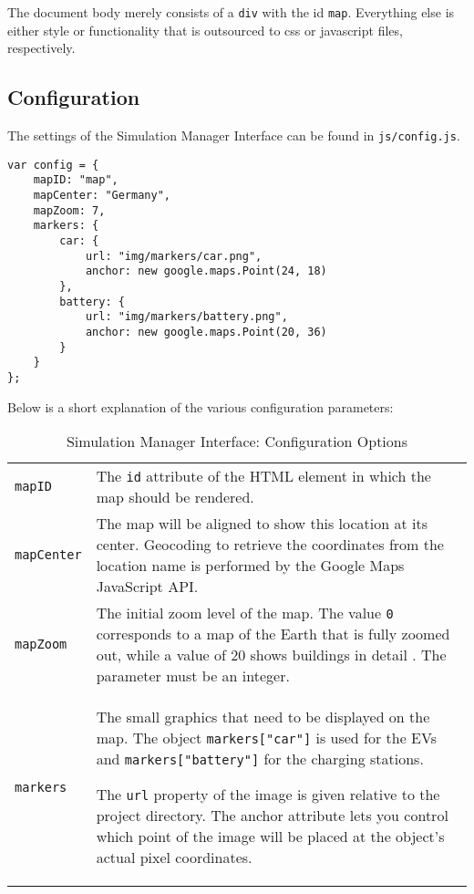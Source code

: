 The document body merely consists of a \texttt{div} with the id \texttt{map}. Everything else is either style or functionality that is outsourced to css or javascript files, respectively.

\newpage
\subsection{Configuration}

The settings of the Simulation Manager Interface can be found in \texttt{js/config.js}.

\begin{verbatim}
var config = {
    mapID: "map",
    mapCenter: "Germany",
    mapZoom: 7,
    markers: {
        car: {
            url: "img/markers/car.png",
            anchor: new google.maps.Point(24, 18)
        },
        battery: {
            url: "img/markers/battery.png",
            anchor: new google.maps.Point(20, 36)
        }
    }
};
\end{verbatim}

Below is a short explanation of the various configuration parameters:

\begin{table}[htp]
\renewcommand{\arraystretch}{1.8}
\begin{tabular}{p{1.6cm}p{5.8cm}}
\texttt{mapID} & The \texttt{id} attribute of the HTML element in which the map should be rendered.\\
\texttt{mapCenter} &  The map will be aligned to show this location at its center. Geocoding to retrieve the coordinates from the location name is performed by the Google Maps JavaScript API.\\
\texttt{mapZoom} &  The initial zoom level of the map. The value \texttt{0} corresponds to a map of the Earth that is fully zoomed out, while a value of 20 shows buildings in detail \cite{google-api-zoom}. The parameter must be an integer.\\
\texttt{markers} & The small graphics that need to be displayed on the map. The object \texttt{markers["car"]} is used for the EVs and \texttt{markers["battery"]} for the charging stations.

The \texttt{url} property of the image is given relative to the project directory. The anchor attribute lets you control which point of the image will be placed at the object's actual pixel coordinates.
\end{tabular}
\vspace{4mm}
\caption{Simulation Manager Interface: Configuration Options}
\end{table}


